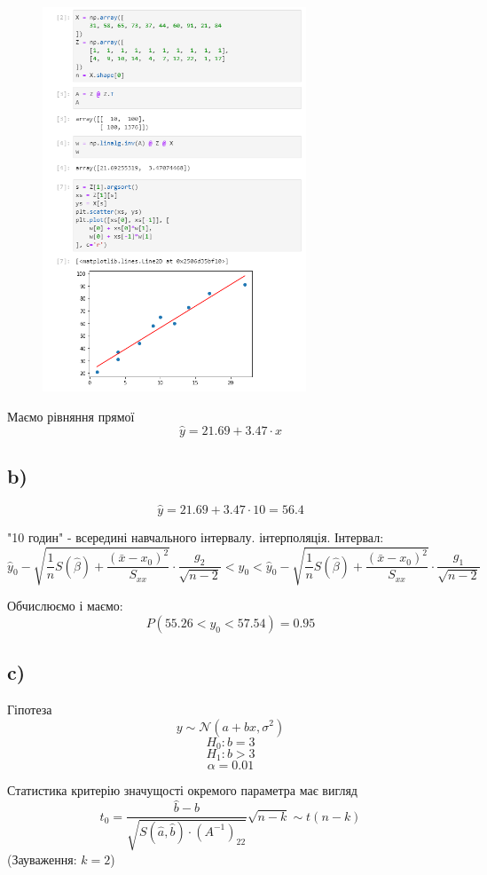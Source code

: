 \documentclass[11pt, a4paper]{article} %
\begin{document}
\begin{figure}[h]
    \centering
    \includegraphics[width=0.7\textwidth]{task5.1.png}
\end{figure}
\pagebreak

Маємо рівняння прямої 
$$\hat y = 21.69 + 3.47 \cdot x$$

\subsection*{b)}
$$\hat y = 21.69 + 3.47 \cdot 10 = 56.4$$

"10 годин" - всередині навчального інтервалу. інтерполяція. Інтервал:
$$\hat y_0 - \sqrt{\frac{1}{n}S(\hat \beta) + \frac{(\bar x - x_0)^2}{S_{xx}}} \cdot \frac{g_2}{\sqrt{n-2}} < y_0 < \hat y_0 - \sqrt{\frac{1}{n}S(\hat \beta) + \frac{(\bar x - x_0)^2}{S_{xx}}} \cdot \frac{g_1}{\sqrt{n-2}}$$

Обчислюємо і маємо:
$$P(55.26 < y_0 < 57.54) = 0.95$$

\subsection*{c)}
Гіпотеза
$$y \sim \mathcal N (a+bx, \sigma^2)$$
$$H_0 : b=3$$
$$H_1 : b>3$$
$$\alpha = 0.01$$

Статистика критерію значущості окремого параметра має вигляд
$$t_0 = \frac{\hat b - b}{\sqrt{S(\hat a, \hat b) \cdot \left(A^{-1}\right)_{22}}}\sqrt{n-k} \sim t(n-k)$$
(Зауваження: $k=2$)
\end{document}
